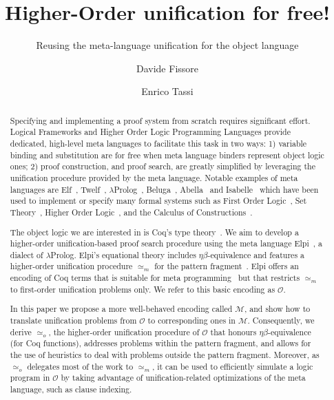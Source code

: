 \documentclass[sigconf,natbib=false,review]{acmart}
\newcommand{\UnifRel}{\ensuremath{\simeq}}
\newcommand{\Uo}{\texorpdfstring{\ensuremath{\UnifRel_o}\xspace}{unif\_o}}
\newcommand{\Ue}{\ensuremath{\UnifRel_m}\xspace}
\newcommand{\Fo}{\texorpdfstring{\ensuremath{\mathcal{O}}\xspace}{O}}
\newcommand{\Ho}{\texorpdfstring{\ensuremath{\mathcal{M}}\xspace}{M}}
\begin{document}
\title{Higher-Order unification for free!}
\subtitle{Reusing the meta-language unification for the object language}

\author{Davide Fissore}

\author{Enrico Tassi}

\begin{abstract}
  Specifying and implementing a proof system from scratch requires significant effort.
  Logical Frameworks and Higher Order Logic Programming Languages provide
  dedicated, high-level meta languages to facilitate this task in two
  ways: 1) variable binding and substitution are for free when meta language binders
  represent object logic ones; 2) proof construction, and %
  proof search, are
  greatly simplified by leveraging the unification procedure provided by the meta language.
  Notable examples of meta languages are Elf~\cite{elf}, Twelf~\cite{twelf},
  $\lambda$Prolog~\cite{miller_nadathur_2012}, Beluga~\cite{Beluga}, Abella~\cite{gacek2008abella} and
  Isabelle~\cite{10.1007/978-3-540-71067-7_7}
  which have been %
  used to implement or specify %
  many
  formal systems such as
  First Order Logic~\cite{felty88cade},
  Set Theory~\cite{10.1007/BF00881873},
  Higher Order Logic~\cite{books/sp/NipkowPW02}, and %
  the Calculus of
  Constructions~\cite{felty93lics}.

  The object logic we are interested in is
  Coq's type theory~\cite{Coq-refman}. We aim to
  develop a higher-order unification-based 
  proof search procedure %
  using the meta language
  Elpi~\cite{dunchev15lpar}, a dialect of $\lambda$Prolog.
  Elpi's equational theory includes
  $\eta\beta$-equivalence and features a
  higher-order unification procedure \Ue 
  for the
  pattern fragment~\cite{miller92jsc}.
  Elpi offers an encoding of Coq terms that is suitable
  for meta programming~\cite{tassi:hal-01637063,tassi:hal-01897468,gregoire:hal-03800154,newtc}
  but that restricts \Ue to first-order unification problems only.
  We refer to this basic encoding as \Fo.
  
  In this paper we propose a more well-behaved encoding called \Ho,
  and show how to translate unification problems from \Fo{}
  to corresponding ones in \Ho.
  Consequently, we derive \Uo{}, the higher-order unification procedure of \Fo{}
    that honours $\eta\beta$-equivalence (for Coq functions), addresses
  problems within the pattern fragment, and allows
  for the use of heuristics to deal with problems outside the
  pattern fragment. Moreover, as \Uo{} delegates most of the work to \Ue,
  it can be used to efficiently simulate a logic program in \Fo{} by
  taking advantage of
  unification-related optimizations of the meta language, such as clause indexing.

\end{abstract}
\end{document}
